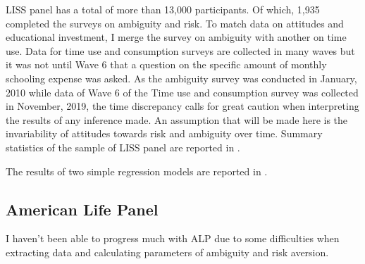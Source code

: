 \documentclass[]{article}
\begin{document}
LISS panel has a total of more than 13,000 participants. Of which, 1,935 completed the surveys on ambiguity and risk. To match data on attitudes and educational investment, I merge the survey on ambiguity with another on time use. Data for time use and consumption surveys  are collected in many waves but it was not until Wave 6 that a question on the specific amount of monthly schooling expense was asked. As the ambiguity survey was conducted in January, 2010 while data of Wave 6 of the Time use and consumption survey was collected in November, 2019, the time discrepancy calls for great caution when interpreting the results of any inference made. An assumption that will be made here is the invariability of attitudes towards risk and ambiguity over time. Summary statistics of the sample of LISS panel are reported in . 

The results of two simple regression models are reported in . 

\subsection{American Life Panel}
I haven't been able to progress much with ALP due to some difficulties when extracting data and calculating parameters of ambiguity and risk aversion. 

\pagebreak



\end{document}
